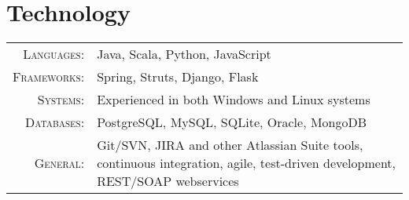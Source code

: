 \section{Technology}

\begin{tabular}{r|p{11cm}}
	\textsc{Languages}: & Java, Scala, Python, JavaScript \\
	\textsc{Frameworks}: & Spring, Struts, Django, Flask \\
	\textsc{Systems}: & Experienced in both Windows and Linux systems \\
	\textsc{Databases}: & PostgreSQL, MySQL, SQLite, Oracle, MongoDB \\
	\textsc{General}: & Git/SVN, JIRA and other Atlassian Suite tools, continuous integration, agile, test-driven development, REST/SOAP webservices \\
\end{tabular}